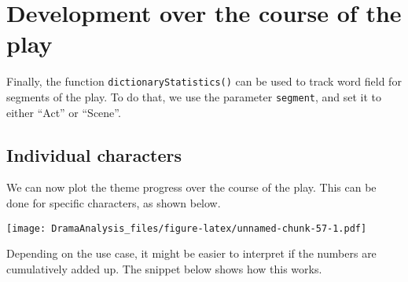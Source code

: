 \documentclass[]{book}
\newenvironment{Shaded}{\begin{snugshade}}{\end{snugshade}}
\newcommand{\DataTypeTok}[1]{\textcolor[rgb]{0.13,0.29,0.53}{#1}}
\newcommand{\DecValTok}[1]{\textcolor[rgb]{0.00,0.00,0.81}{#1}}
\newcommand{\FloatTok}[1]{\textcolor[rgb]{0.00,0.00,0.81}{#1}}
\newcommand{\KeywordTok}[1]{\textcolor[rgb]{0.13,0.29,0.53}{\textbf{#1}}}
\newcommand{\NormalTok}[1]{#1}
\newcommand{\OperatorTok}[1]{\textcolor[rgb]{0.81,0.36,0.00}{\textbf{#1}}}
\newcommand{\OtherTok}[1]{\textcolor[rgb]{0.56,0.35,0.01}{#1}}
\newcommand{\StringTok}[1]{\textcolor[rgb]{0.31,0.60,0.02}{#1}}
\begin{document}
\hypertarget{development-over-the-course-of-the-play}{%
\section{Development over the course of the play}\label{development-over-the-course-of-the-play}}

Finally, the function \texttt{dictionaryStatistics()} can be used to track word field for segments of the play. To do that, we use the parameter \texttt{segment}, and set it to either ``Act'' or ``Scene''.

\hypertarget{individual-characters}{%
\subsection{Individual characters}\label{individual-characters}}

We can now plot the theme progress over the course of the play. This can be done for specific characters, as shown below.

\begin{Shaded}
\end{Shaded}

\texttt{[image: DramaAnalysis\_files/figure-latex/unnamed-chunk-57-1.pdf]}

Depending on the use case, it might be easier to interpret if the numbers are cumulatively added up. The snippet below shows how this works.
\end{document}
